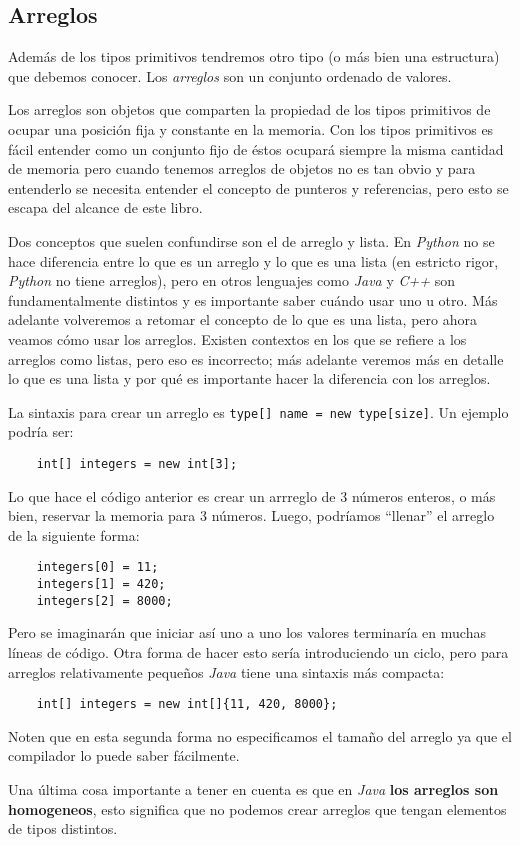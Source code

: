\subsection{Arreglos}
  Además de los tipos primitivos tendremos otro tipo (o más bien una estructura) que debemos 
  conocer.
  Los \textit{arreglos} son un conjunto ordenado de valores.

  Los arreglos son objetos que comparten la propiedad de los tipos primitivos de ocupar una posición
  fija y constante en la memoria.
  Con los tipos primitivos es fácil entender como un conjunto fijo de éstos ocupará siempre la misma
  cantidad de memoria pero cuando tenemos arreglos de objetos no es tan obvio y para entenderlo se
  necesita entender el concepto de punteros y referencias, pero esto se escapa del alcance de este 
  libro.\autocite{java-nutshell-syntax-arrays}

  Dos conceptos que suelen confundirse son el de arreglo y lista.
  En \textit{Python} no se hace diferencia entre lo que es un arreglo y lo que es una lista (en 
  estricto rigor, \textit{Python} no tiene arreglos), pero en otros lenguajes como \textit{Java} y 
  \textit{C++} son fundamentalmente distintos y es importante saber cuándo usar uno u otro.
  Más adelante volveremos a retomar el concepto de lo que es una lista, pero ahora veamos cómo usar
  los arreglos.
  Existen contextos en los que se refiere a los arreglos como listas, pero eso es incorrecto; más
  adelante veremos más en detalle lo que es una lista y por qué es importante hacer la diferencia
  con los arreglos.

  La sintaxis para crear un arreglo es \texttt{type[] name = new type[size]}.
  Un ejemplo podría ser:
  \begin{verbatim}
    int[] integers = new int[3];
  \end{verbatim}

  Lo que hace el código anterior es crear un arrreglo de 3 números enteros, o más bien, reservar la
  memoria para 3 números.
  Luego, podríamos \enquote{llenar} el arreglo de la siguiente forma:
  \begin{verbatim}
    integers[0] = 11;
    integers[1] = 420;
    integers[2] = 8000;
  \end{verbatim}

  Pero se imaginarán que iniciar así uno a uno los valores terminaría en muchas líneas de código.
  Otra forma de hacer esto sería introduciendo un ciclo, pero para arreglos relativamente pequeños
  \textit{Java} tiene una sintaxis más compacta:
  \begin{verbatim}
    int[] integers = new int[]{11, 420, 8000};
  \end{verbatim}

  Noten que en esta segunda forma no especificamos el tamaño del arreglo ya que el compilador lo 
  puede saber fácilmente.

  \begin{important}
    Una última cosa importante a tener en cuenta es que en \textit{Java} \textbf{los arreglos son 
    homogeneos}, esto significa que no podemos crear arreglos que tengan elementos de tipos distintos.
  \end{important}